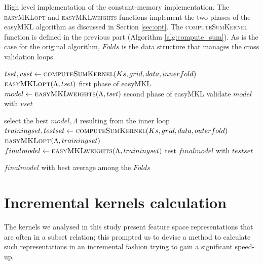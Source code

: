 \begin{algorithm}
    \caption{
        High level implementation of the constant-memory implementation.
        The \textsc{easyMKLopt} and \textsc{easyMKLweights} functions implement
        the two phases of the easyMKL algorithm as discussed in Section \ref{sec:opt}.
        The \textsc{computeSumKernel} function is defined in the previous part
        (Algorithm \ref{alg:compute_sum}).
        As is the case for the original algorithm, $Folds$ is the data structure
        that manages the cross validation loops.
    }

    \label{alg:method_me}
    \begin{algorithmic}[1]
                    \State $tset,vset \gets \Call{computeSumKernel}{Ks,grid,data,innerfold}$
                    \State $\Call{easyMKLopt}{\Lambda,tset}$
                    \Comment first phase of easyMKL
                    \State $model \gets \Call{easyMKLweights}{\Lambda,tset}$
                    \Comment second phase of easyMKL
                    \State validate $model$ with $vset$
                \EndFor
            \EndFor
            
            \State select the best $model,\Lambda$ resulting from the inner loop
            \State $trainingset,testset \gets \Call{computeSumKernel}{Ks,grid,data,outerfold}$
            \State $\Call{easyMKLopt}{\Lambda,trainingset}$
            \State $finalmodel \gets \Call{easyMKLweights}{\Lambda,trainingset}$
            \State test $finalmodel$ with $testset$
        \EndFor

        \State \Return $finalmodel$ with best average among the $Folds$
    \end{algorithmic}
\end{algorithm}


\section{Incremental kernels calculation} 
\label{sec:inc}
The kernels we analysed in this study present feature space representations
that are often in a subset relation; this prompted us to devise a method to
calculate such representations in an incremental fashion trying to gain a
significant speed-up.

